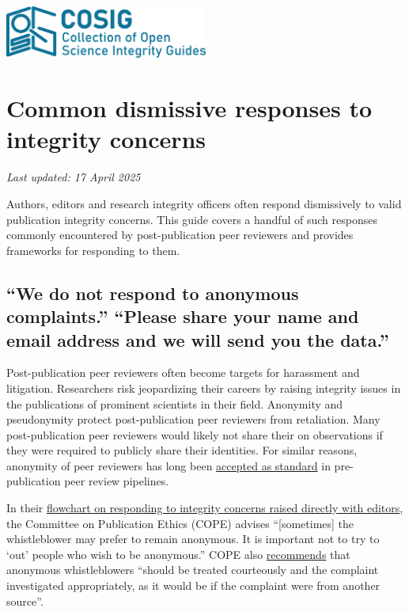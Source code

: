 \documentclass[letterpaper, 12pt]{article}
\begin{document}
\flushleft
\includegraphics[width=0.5\textwidth]{img/home/241017_final_logo_mockup.png}

\section*{Common dismissive responses to integrity concerns}
\textit{Last updated: 17 April 2025}

Authors, editors and research integrity officers often respond dismissively to valid publication integrity concerns. This guide covers a handful of such responses commonly encountered by post-publication peer reviewers and provides frameworks for responding to them.

\subsection*{``We do not respond to anonymous complaints.''\newline 
``Please share your name and email address and we will send you the data.''}

Post-publication peer reviewers often become targets for harassment and litigation. Researchers risk jeopardizing their careers by raising integrity issues in the publications of prominent scientists in their field. Anonymity and pseudonymity protect post-publication peer reviewers from retaliation. Many post-publication peer reviewers would likely not share their on observations if they were required to publicly share their identities. For similar reasons, anonymity of peer reviewers has long been \href{https://doi.org/10.1038/6295}{accepted as standard} in pre-publication peer review pipelines. 

In their \href{https://doi.org/10.24318/cope.2019.2.25}{flowchart on responding to integrity concerns raised directly with editors}, the Committee on Publication Ethics (COPE) advises ``[sometimes] the whistleblower may prefer
to remain anonymous. It is important not to try to `out' people who wish to be anonymous.'' COPE also \href{https://doi.org/10.24318/Z9gtPzCa}{recommends} that anonymous whistleblowers ``should be treated courteously and the complaint investigated appropriately, as it would be if the complaint were from another source''.
\end{document}
